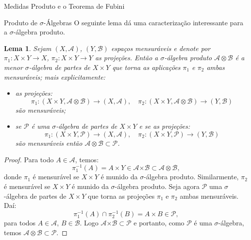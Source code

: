 \documentclass[oneside,final,11pt]{amsbook}
\newcommand{\Times}{\pmb{\times}}
\theoremstyle{remark}\newtheorem{exercise}{Exercício}[chapter]
\theoremstyle{remark}\newtheorem{*exercise}[exercise]{\hbox to 0pt{\hskip 0pt minus 1fil*}Exercício}
\theoremstyle{definition}\newtheorem{exdefin}{Definição}[chapter]
\theoremstyle{plain}\newtheorem{teo}{Teorema}[section]
\theoremstyle{plain}\newtheorem{lem}[teo]{Lema}
\theoremstyle{plain}\newtheorem{prop}[teo]{Proposição}
\theoremstyle{plain}\newtheorem{cor}[teo]{Corolário}
\theoremstyle{definition}\newtheorem{defin}[teo]{Definição}
\theoremstyle{remark}\newtheorem{rem}[teo]{Observação}
\theoremstyle{definition}\newtheorem{notation}[teo]{Notação}
\theoremstyle{definition}\newtheorem{convention}[teo]{Convenção}
\theoremstyle{definition}\newtheorem{example}[teo]{Exemplo}
\numberwithin{section}{chapter}
\numberwithin{equation}{section}
\begin{document}
\begin{chapter}{Medidas Produto e o Teorema de Fubini}
\begin{section}{Produto de ${\sigma}$-Álgebras}
O seguinte lema dá uma caracterização interessante para a $\sigma$-álgebra produto.
\begin{lem}\label{thm:sigmaprodmin}
Sejam $(X,\mathcal A)$, $(Y,\mathcal B)$ espaços mensuráveis e denote por
$\pi_1:X\times Y\to X$, $\pi_2:X\times Y\to Y$ as projeções. Então a $\sigma$-álgebra
produto $\mathcal A\otimes\mathcal B$ é a menor $\sigma$-álgebra de partes de
$X\times Y$ que torna as aplicações $\pi_1$ e $\pi_2$ ambas mensuráveis; mais explicitamente:
\begin{itemize}
\item as projeções:
\[\pi_1:(X\times Y,\mathcal A\otimes\mathcal B)\to(X,\mathcal A),\quad
\pi_2:(X\times Y,\mathcal A\otimes\mathcal B)\to(Y,\mathcal B)\]
são mensuráveis;
\item se $\mathcal P$ é uma $\sigma$-álgebra de partes de $X\times Y$ e se as projeções:
\[\pi_1:(X\times Y,\mathcal P)\to(X,\mathcal A),\quad
\pi_2:(X\times Y,\mathcal P)\to(Y,\mathcal B)\]
são mensuráveis então $\mathcal A\otimes\mathcal B\subset\mathcal P$.
\end{itemize}
\end{lem}
\begin{proof}
Para todo $A\in\mathcal A$, temos:
\[\pi_1^{-1}(A)=A\times Y\in\mathcal A\Times\mathcal B\subset\mathcal A\otimes\mathcal B,\]
donde $\pi_1$ é mensurável se $X\times Y$ é munido da $\sigma$-álgebra
produto. Similarmente, $\pi_2$ é mensurável se $X\times Y$ é munido da $\sigma$-álgebra
produto. Seja agora $\mathcal P$ uma $\sigma$-álgebra de partes de $X\times Y$ que torna
as projeções $\pi_1$ e $\pi_2$ ambas mensuráveis. Daí:
\[\pi_1^{-1}(A)\cap\pi_2^{-1}(B)=A\times B\in\mathcal P,\]
para todos $A\in\mathcal A$, $B\in\mathcal B$. Logo $\mathcal A\Times\mathcal B\subset\mathcal P$
e portanto, como $\mathcal P$ é uma $\sigma$-álgebra, temos $\mathcal A\otimes\mathcal B\subset\mathcal P$.
\end{proof}


\end{section}
\end{chapter}
\end{document}
